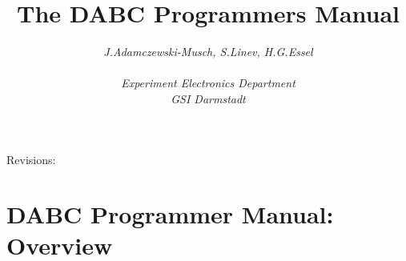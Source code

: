 \documentclass{dabcclass}
\begin{document}
\title{ \huge \bf  The DABC Programmers Manual\\} 
\author{\em J.Adamczewski-Musch, S.Linev, H.G.Essel \\ \\ Experiment Electronics Department \\
GSI Darmstadt} 
\maketitle 

\thispagestyle{empty} 
{\huge Revisions:}

\clearpage

\thispagestyle{empty} \tableofcontents
\thispagestyle{empty} \cleardoublepage
\chapter{DABC Programmer Manual: Overview}
 \cleardoublepage


\end{document}
